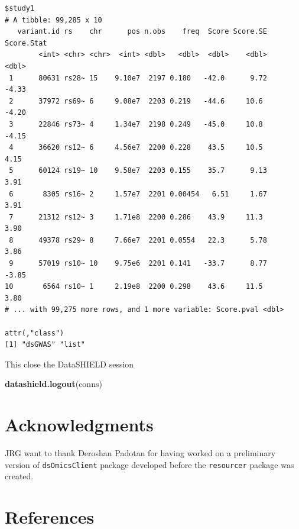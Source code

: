 \documentclass[]{article}
\newenvironment{Shaded}{\begin{snugshade}}{\end{snugshade}}
\newcommand{\KeywordTok}[1]{\textcolor[rgb]{0.13,0.29,0.53}{\textbf{#1}}}
\newcommand{\NormalTok}[1]{#1}
\begin{document}
\begin{verbatim}
$study1
# A tibble: 99,285 x 10
   variant.id rs    chr      pos n.obs    freq  Score Score.SE Score.Stat
        <int> <chr> <chr>  <int> <dbl>   <dbl>  <dbl>    <dbl>      <dbl>
 1      80631 rs28~ 15    9.10e7  2197 0.180   -42.0      9.72      -4.33
 2      37972 rs69~ 6     9.08e7  2203 0.219   -44.6     10.6       -4.20
 3      22846 rs73~ 4     1.34e7  2198 0.249   -45.0     10.8       -4.15
 4      36620 rs12~ 6     4.56e7  2200 0.228    43.5     10.5        4.15
 5      60124 rs19~ 10    9.58e7  2203 0.155    35.7      9.13       3.91
 6       8305 rs16~ 2     1.57e7  2201 0.00454   6.51     1.67       3.91
 7      21312 rs12~ 3     1.71e8  2200 0.286    43.9     11.3        3.90
 8      49378 rs29~ 8     7.66e7  2201 0.0554   22.3      5.78       3.86
 9      57019 rs10~ 10    9.75e6  2201 0.141   -33.7      8.77      -3.85
10       6564 rs10~ 1     2.19e8  2200 0.298    43.6     11.5        3.80
# ... with 99,275 more rows, and 1 more variable: Score.pval <dbl>

attr(,"class")
[1] "dsGWAS" "list"  
\end{verbatim}

This close the DataSHIELD session

\begin{Shaded}
\begin{Highlighting}[]
\KeywordTok{datashield.logout}\NormalTok{(conns)}
\end{Highlighting}
\end{Shaded}

\hypertarget{acknowledgments}{%
\section{Acknowledgments}\label{acknowledgments}}

JRG want to thank Deroshan Padotan for having worked on a preliminary
version of \texttt{dsOmicsClient} package developed before the
\texttt{resourcer} package was created.

\hypertarget{references}{%
\section*{References}\label{references}}
\end{document}
